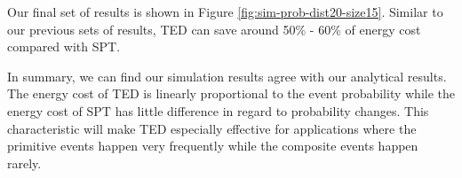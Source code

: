 Our final set of results is shown in Figure \ref{fig:sim-prob-dist20-size15}. Similar to our previous sets of results, TED can save around 50\% - 60\% of energy cost compared with SPT.

In summary, we can find our simulation results agree with our analytical results. The energy cost of TED is linearly proportional to the event probability while the energy cost of SPT has little difference in regard to probability changes. This characteristic will make TED especially effective for applications where the primitive events happen very frequently while the composite events happen rarely.